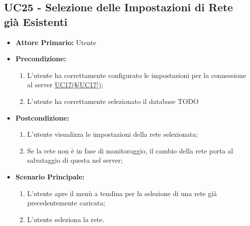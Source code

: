 \subsection{UC25 - Selezione delle Impostazioni di Rete già Esistenti}\label{UC25}
\begin{itemize}
	\item \textbf{Attore Primario:}  Utente
	\item \textbf{Precondizione:} 
	\begin{enumerate}
		\item L'utente ha correttamente configurato le impostazioni per la connessione al server \hyperref[UC17]{UC17(§\ref*{UC17})};
		\item L'utente ha correttamente selezionato il database TODO %
	\end{enumerate}	
	\item \textbf{Postcondizione:} 
	\begin{enumerate}
		\item L'utente visualizza le impostazioni della rete selezionata;
		\item Se la rete non è in fase di monitoraggio, il cambio della rete porta al salvataggio di questa nel server;
	\end{enumerate}
	\item \textbf{Scenario Principale:}
	\begin{enumerate}
		\item L'utente apre il menù a tendina per la selezione di una rete già precedentemente caricata;
		\item L'utente seleziona la rete.
	\end{enumerate}
\end{itemize}

